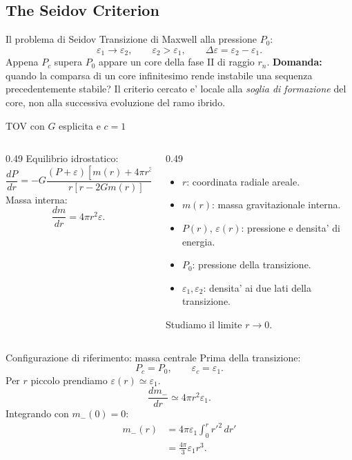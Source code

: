 \subsection{The Seidov Criterion}

\begin{frame}{Il problema di Seidov}
\small
Transizione di Maxwell alla pressione $P_0$:
\[
\varepsilon_1\longrightarrow\varepsilon_2,
\qquad \varepsilon_2>\varepsilon_1,
\qquad \Delta\varepsilon=\varepsilon_2-\varepsilon_1.
\]
Appena $P_c$ supera $P_0$ appare un core della fase II di raggio $r_n$.
\medskip
\textbf{Domanda:} quando la comparsa di un core infinitesimo
rende instabile una sequenza precedentemente stabile?
\medskip
Il criterio cercato e' locale alla \emph{soglia di formazione}
del core, non alla successiva evoluzione del ramo ibrido.
\end{frame}

\begin{frame}{TOV con $G$ esplicita e $c=1$}
\small
\begin{columns}[T,onlytextwidth]
\begin{column}{0.49\textwidth}
Equilibrio idrostatico:
\[
\frac{dP}{dr}=-G\frac{(P+\varepsilon)
[m(r)+4\pi r^3P]}{r[r-2Gm(r)]}.
\]
Massa interna:
\[
\frac{dm}{dr}=4\pi r^2\varepsilon.
\]
\end{column}
\begin{column}{0.49\textwidth}
\begin{itemize}
\item $r$: coordinata radiale areale.
\item $m(r)$: massa gravitazionale interna.
\item $P(r)$, $\varepsilon(r)$: pressione e densita' di energia.
\item $P_0$: pressione della transizione.
\item $\varepsilon_1,\varepsilon_2$: densita' ai due lati della transizione.
\end{itemize}
\medskip
Studiamo il limite $r\to0$.
\end{column}
\end{columns}
\end{frame}

\begin{frame}{Configurazione di riferimento: massa centrale}
\small
Prima della transizione:
\[
P_c=P_0,\qquad\varepsilon_c=\varepsilon_1.
\]
Per $r$ piccolo prendiamo $\varepsilon(r)\simeq\varepsilon_1$.
\[
\frac{dm_-}{dr}\simeq4\pi r^2\varepsilon_1.
\]
Integrando con $m_-(0)=0$:
\[
\begin{aligned}
m_-(r)&=4\pi\varepsilon_1\int_0^r r'^2\,dr'\\
&=\frac{4\pi}{3}\varepsilon_1r^3.
\end{aligned}
\]
\end{frame}

